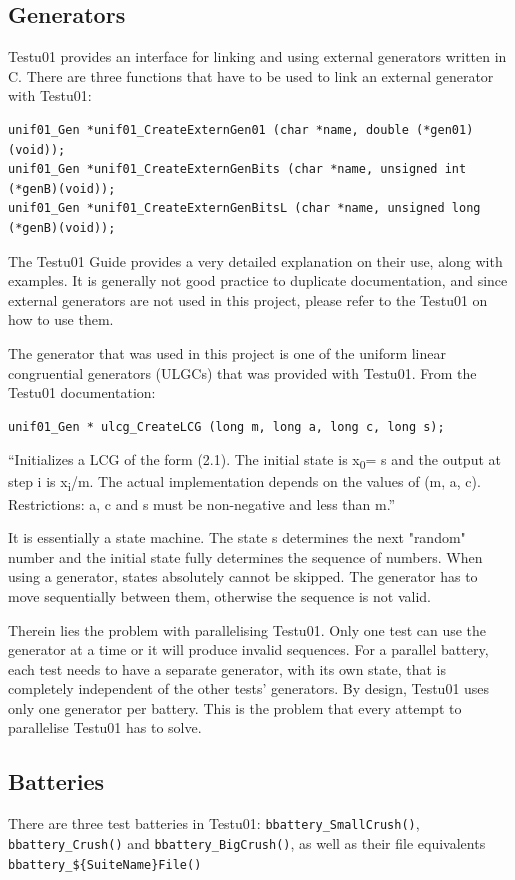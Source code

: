 \subsection{Generators}
Testu01 provides an interface for linking and using external generators written in C.
There are three functions that have to be used to link an external generator with Testu01:
\begin{verbatim}
unif01_Gen *unif01_CreateExternGen01 (char *name, double (*gen01)(void));
unif01_Gen *unif01_CreateExternGenBits (char *name, unsigned int (*genB)(void));
unif01_Gen *unif01_CreateExternGenBitsL (char *name, unsigned long (*genB)(void));
\end{verbatim}

The Testu01 Guide provides a very detailed explanation on their use, along with examples. It is generally not good practice to duplicate documentation, and since external generators are not used in this project, please refer to the Testu01 on how to use them.

The generator that was used in this project is one of the uniform linear congruential generators (ULGCs) that was provided with Testu01.
From the Testu01 documentation\cite{testu01guide-p25}:
\begin{verbatim}
unif01_Gen * ulcg_CreateLCG (long m, long a, long c, long s);
\end{verbatim}

``Initializes a LCG of the form (2.1).
The initial state is x\textsubscript{0}= s and the output at step i is x\textsubscript{i}/m.
The actual implementation depends on the values of (m, a, c). Restrictions: a, c and s must be
non-negative and less than m.''

It is essentially a state machine. The state s determines the next "random" number and the initial state fully determines the sequence of numbers. When using a generator, states absolutely cannot be skipped. The generator has to move sequentially between them, otherwise the sequence is not valid.

Therein lies the problem with parallelising Testu01. Only one test can use the generator at a time or it will produce invalid sequences. For a parallel battery, each test needs to have a separate generator, with its own state, that is completely independent of the other tests' generators. By design, Testu01 uses only one generator per battery. This is the problem that every attempt to parallelise Testu01 has to solve.

\subsection{Batteries}
There are three test batteries in Testu01: \texttt{bbattery\_SmallCrush()}, \texttt{bbattery\_Crush()} and \texttt{bbattery\_BigCrush()}, as well as their file equivalents \texttt{bbattery\_\$\{SuiteName\}File()}

